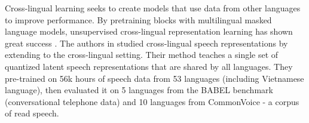 Cross-lingual learning seeks to create models that use data from other languages to improve performance.
By pretraining  blocks with multilingual masked language models, unsupervised cross-lingual representation learning has shown great success \cite{lample2019cross, BERT}. 
The authors in \cite{xlsr53} studied cross-lingual speech representations by extending  \cite{wav2vec2} to the cross-lingual setting. 
Their method teaches a single set of quantized latent speech representations that are shared by all languages.
They pre-trained  on 56k hours of speech data from 53 languages (including Vietnamese language), then evaluated it on 5 languages from the BABEL benchmark (conversational telephone data) \cite{BABEL_dataset} and 10 languages from CommonVoice \cite{CommonVoice_dataset} - a corpus of read speech.

